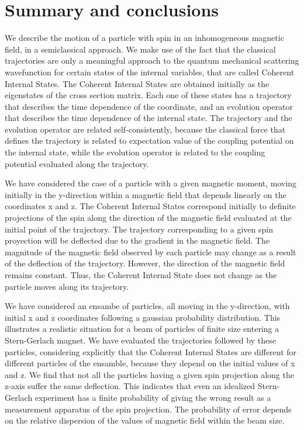 \documentclass[aps,preprint,prl]{revtex4-2}
\begin{document}
\section{Summary and conclusions}

We describe the motion of a particle with spin in an inhomogeneous magnetic 
field, in a semiclassical approach. We make use of the fact that
the  classical trajectories are only a meaningful approach to the quantum
mechanical scattering wavefunction for certain states of the internal
variables, that are called Coherent Internal States. The Coherent Internal
States are obtained initially as the eigenstates of the cross section matrix. 
Each one of these states has a trajectory that describes the time dependence 
of the
coordinate, and an evolution operator that describes the time dependence 
 of the internal state. The trajectory and the evolution operator are 
related self-consistently, because the classical force that
defines the trajectory is related to expectation value of the coupling
potential on the internal state, while the evolution operator is related 
to the coupling potential evaluated along the trajectory.


We have considered the case of a particle with a given magnetic moment,
moving initially in the y-direction within a magnetic field that depends 
linearly on 
the coordinates x and z. The Coherent Internal States correspond 
initially to definite projections of the spin along the direction of the 
magnetic field 
evaluated at the initial point of the trajectory. The trajectory corresponding
to a given spin proyection will be deflected due to the gradient in the 
magnetic field. The magnitude of the magnetic field observed by each particle 
may change as a result of the deflection of the trajectory.
However, the direction of
the magnetic field remains constant. Thus, the Coherent Internal State does not
change as the particle moves along its trajectory.

We have considered an ensambe of particles, all moving in the y-direction,
with initial x and z coordinates following a gaussian probability distribution.
This illustrates a realistic situation for a beam of particles of finite size
entering a Stern-Gerlach magnet. We have evaluated the trajectories followed by
these particles, considering explicitly that the Coherent Internal States are
different for different particles of the ensamble, because they depend on
the initial values of x and z. We find that not all the particles having a 
given spin projection along the z-axis suffer the same deflection. 
This indicates that even
an idealized Stern-Gerlach experiment has a finite probability of giving
the wrong result as a measurement apparatus of the spin projection. The
probability of error depends on the relative dispersion of the values of 
magnetic field within the beam size.
\end{document}

